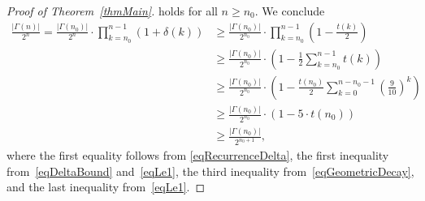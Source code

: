 \documentclass[10pt,a4paper]{amsart}
\begin{document}
\begin{proof}[Proof of Theorem~\ref{thmMain}]
    holds for all $n \ge n_0$.
    We conclude
    \begin{align*}
        \frac{|\Gamma(n)|}{2^n}
        = \frac{|\Gamma(n_0)|}{2^{n}} \cdot \prod_{k=n_0}^{n - 1} (1 + \delta(k))
        & \ge \frac{|\Gamma(n_0)|}{2^{n_0}} \cdot \prod_{k=n_0}^{n - 1} \left( 1 - \frac{t(k)}{2} \right) \\
        & \ge \frac{|\Gamma(n_0)|}{2^{n_0}} \cdot \left( 1 - \frac{1}{2} \sum_{k=n_0}^{n - 1} t(k) \right) \\
        & \ge \frac{|\Gamma(n_0)|}{2^{n_0}} \cdot \left( 1 - \frac{t(n_0)}{2} \sum_{k=0}^{n - n_0 - 1} \left( \frac{9}{10}\right)^k \right) \\
        & \ge \frac{|\Gamma(n_0)|}{2^{n_0}} \cdot \left( 1 - 5 \cdot t(n_0) \right) \\
        & \ge \frac{|\Gamma(n_0)|}{2^{n_0 + 1}},
    \end{align*}    
    where the first equality follows from \eqref{eqRecurrenceDelta}, the first inequality from~\eqref{eqDeltaBound} and~\eqref{eqLe1}, the third inequality from~\eqref{eqGeometricDecay}, and the last inequality from~\eqref{eqLe1}.
\end{proof}
\end{document}
